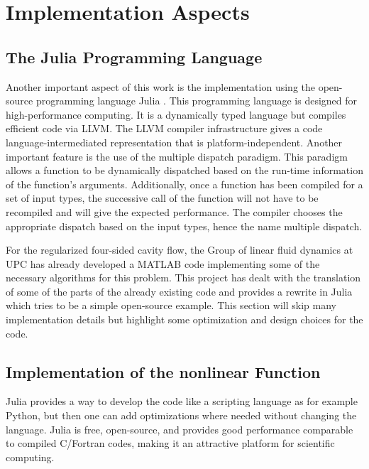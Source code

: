 
\section{Implementation Aspects} \label{sec:impl}

\subsection{The Julia Programming Language}

Another important aspect of this work is the implementation using the
open-source programming language Julia \citep{bezanson2017}. This programming
language is designed for high-performance computing. It is a dynamically typed
language but compiles efficient code via LLVM. The LLVM compiler infrastructure
gives a code language-intermediated representation that is
platform-independent. Another important feature is the use of the multiple
dispatch paradigm. This paradigm allows a function to be dynamically dispatched
based on the run-time information of the function's arguments. Additionally,
once a function has been compiled for a set of input types, the successive call
of the function will not have to be recompiled and will give the expected
performance. The compiler chooses the appropriate dispatch based on the input
types, hence the name multiple dispatch.

For the regularized four-sided cavity flow, the Group of linear fluid
dynamics at UPC has already developed a MATLAB code implementing some
of the necessary algorithms for this problem. This project has dealt with the
translation of some of the parts of the already existing code and provides a
rewrite in Julia which tries to be a simple open-source example. This section
will skip many implementation details but highlight some optimization and
design choices for the code.

\subsection{Implementation of the nonlinear Function}

Julia provides a way to develop the code like a scripting language as for
example Python, but then one can add optimizations where needed without
changing the language. Julia is free, open-source, and provides good
performance comparable to compiled C/Fortran codes, making it an attractive
platform for scientific computing. 

